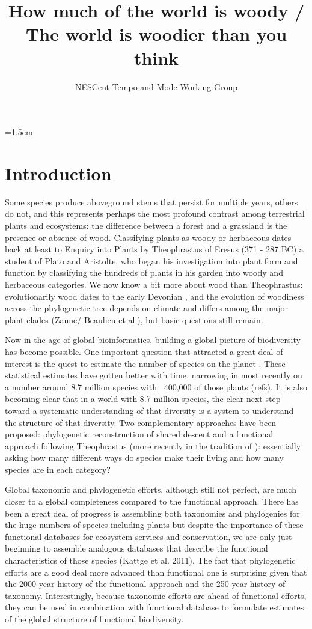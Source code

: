 \documentclass[12pt]{article}
\title{How much of the world is woody / The world is woodier than you
  think}
\author{NESCent Tempo and Mode Working Group}
\date{}
\affiliation{\noindent
Fill this in here\ldots}
\begin{document}
\mstitlepage
\parindent=1.5em
\addtolength{\parskip}{.3em}

\section{Introduction}

Some species produce aboveground stems that persist for multiple years, others do not, and this represents perhaps the most profound contrast among terrestrial plants and ecosystems: the difference between a forest and a grassland is the presence or absence of wood. Classifying plants as woody or herbaceous dates back at least to Enquiry into Plants by Theophrastus of Eresus (371 - 287 BC) a student of Plato and Aristolte, who began his investigation into plant form and function by classifying the hundreds of plants in his garden into woody and herbaceous categories.  We now know a bit more about wood than Theophrastus: evolutionarily wood dates to the early Devonian \citep[~400 mya;][]{gerrienne2011simple}, and the evolution of woodiness across the phylogenetic tree depends on climate and differs among the major plant clades (Zanne/ Beaulieu et al.), but basic questions still remain.

Now in the age of global bioinformatics, building a global picture of biodiversity has become possible.  One important question that attracted a great deal of interest is the quest to estimate the number of species on the planet \citep{erwin1991many, may1988many, stork1993many, mora2011plos}.  These statistical estimates have gotten better with time, narrowing in most recently on a number around 8.7 million species with ~400,000 of those plants (refs).  It is also becoming clear that in a world with 8.7 million species, the clear next step toward a systematic understanding of that diversity is a system to understand the structure of that diversity.  Two complementary approaches have been proposed: phylogenetic reconstruction of shared descent \citep{smith2011understanding} and a functional approach following Theophrastus (more recently in the tradition of \citep{grime1979plant, weiher2009challenging, westoby2002plant}): essentially asking how many different ways do species make their living and how many species are in each category?

Global taxonomic and phylogenetic efforts, although still not perfect, are much closer to a global completeness compared to the functional approach.   There has been a great deal of progress is assembling both taxonomies and phylogenies for the huge numbers of species including plants \citep{smith2011understanding} but despite the importance of these functional databases for ecosystem services and conservation, we are only just beginning to assemble analogous databases that describe the functional characteristics of those species (Kattge et al. 2011).   The fact that phylogenetic efforts are a good deal more advanced than functional one is surprising given that the 2000-year history of the functional approach and the 250-year history of taxonomy.  Interestingly, because taxonomic efforts are ahead of functional efforts, they can be used in combination with functional database to formulate estimates of the global structure of functional biodiversity.
\end{document}
